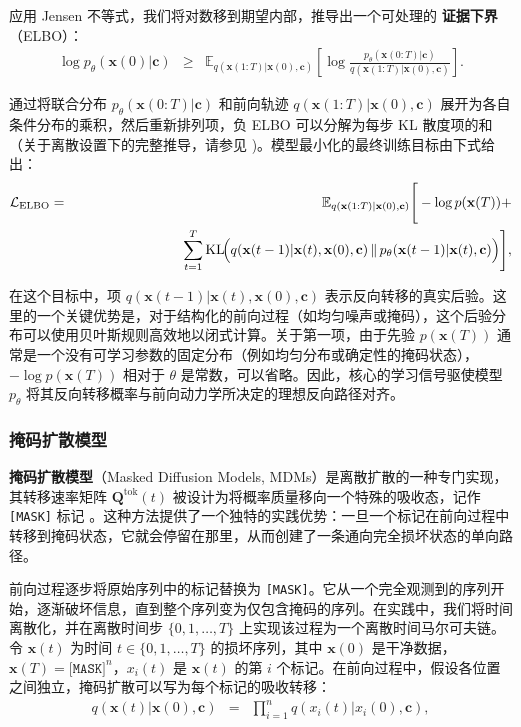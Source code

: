 \noindent 应用 Jensen 不等式，我们将对数移到期望内部，推导出一个可处理的 \textbf{证据下界}（ELBO）：
\begin{eqnarray}
\log p_\theta(\mathbf{x}(0) | \mathbf{c}) & \ge & \mathbb{E}_{q(\mathbf{x}(1{:}T) | \mathbf{x}(0), \mathbf{c})} \left[ \log \frac{p_\theta(\mathbf{x}(0{:}T) | \mathbf{c})}{q(\mathbf{x}(1{:}T) | \mathbf{x}(0), \mathbf{c})} \right].
\end{eqnarray}

通过将联合分布 $p_\theta(\mathbf{x}(0{:}T) | \mathbf{c})$ 和前向轨迹 $q(\mathbf{x}(1{:}T) | \mathbf{x}(0), \mathbf{c})$ 展开为各自条件分布的乘积，然后重新排列项，负 ELBO 可以分解为每步 KL 散度项的和（关于离散设置下的完整推导，请参见 \citep{austin-etal:2021structured})。模型最小化的最终训练目标由下式给出：
\begin{eqnarray}
\mathcal{L}_{\mathrm{ELBO}} & = & \mathbb{E}_{q(\mathbf{x}(1{:}T)| \mathbf{x}(0),\mathbf{c})}
\Bigg[
-\log p(\mathbf{x}(T))
+ \nonumber \\
& & \hspace{2.7cm} \sum_{t=1}^{T}
\mathrm{KL}\!\Big(
q(\mathbf{x}(t-1)| \mathbf{x}(t),\mathbf{x}(0),\mathbf{c})
\,\Vert\,
p_\theta(\mathbf{x}(t-1)| \mathbf{x}(t),\mathbf{c})
\Big)
\Bigg],
\label{eq:discrete-elbo}
\end{eqnarray}

\noindent 在这个目标中，项 $q(\mathbf{x}(t-1)| \mathbf{x}(t),\mathbf{x}(0),\mathbf{c})$ 表示反向转移的真实后验。这里的一个关键优势是，对于结构化的前向过程（如均匀噪声或掩码），这个后验分布可以使用贝叶斯规则高效地以闭式计算。关于第一项，由于先验 $p(\mathbf{x}(T))$ 通常是一个没有可学习参数的固定分布（例如均匀分布或确定性的掩码状态），$-\log p(\mathbf{x}(T))$ 相对于 $\theta$ 是常数，可以省略。因此，核心的学习信号驱使模型 $p_\theta$ 将其反向转移概率与前向动力学所决定的理想反向路径对齐。
\subsubsection{掩码扩散模型}

\textbf{掩码扩散模型}（Masked Diffusion Models, MDMs）是离散扩散的一种专门实现，其转移速率矩阵 $\mathbf{Q}^{\mathrm{tok}}(t)$ 被设计为将概率质量移向一个特殊的吸收态，记作 \texttt{[MASK]} 标记 \citep{sahoo-etal:2024simple,nie-etal:2025large}。这种方法提供了一个独特的实践优势：一旦一个标记在前向过程中转移到掩码状态，它就会停留在那里，从而创建了一条通向完全损坏状态的单向路径。

前向过程逐步将原始序列中的标记替换为 \texttt{[MASK]}。它从一个完全观测到的序列开始，逐渐破坏信息，直到整个序列变为仅包含掩码的序列。在实践中，我们将时间离散化，并在离散时间步 $\{0,1,\dots,T\}$ 上实现该过程为一个离散时间马尔可夫链。令 $\mathbf{x}(t)$ 为时间 $t \in \{0,1,\dots,T\}$ 的损坏序列，其中 $\mathbf{x}(0)$ 是干净数据，$\mathbf{x}(T) = \texttt{[MASK]}^n$，$x_i(t)$ 是 $\mathbf{x}(t)$ 的第 $i$ 个标记。在前向过程中，假设各位置之间独立，掩码扩散可以写为每个标记的吸收转移：
\begin{eqnarray}
q(\mathbf{x}(t) | \mathbf{x}(0), \mathbf{c}) & = & \prod_{i=1}^n q(x_i(t) | x_i(0), \mathbf{c}), \label{eq:mdm-forward-factorize}
\end{eqnarray}


